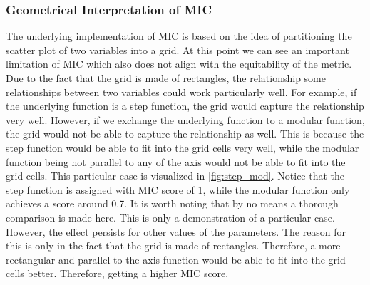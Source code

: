 \documentclass{article}
\begin{document}
\subsubsection{Geometrical Interpretation of MIC}
The underlying implementation of MIC is based on the idea of partitioning the scatter plot of two variables into a grid. At this point we can see an important limitation of MIC which also does not align with the equitability of the metric. Due to the fact that the grid is made of rectangles, the relationship some relationships between two variables could work particularly well. For example, if the underlying function is a step function, the grid would capture the relationship very well. However, if we exchange the underlying function to a modular function, the grid would not be able to capture the relationship as well. This is because the step function would be able to fit into the grid cells very well, while the modular function being not parallel to any of the axis would not be able to fit into the grid cells. This particular case is visualized in \autoref{fig:step_mod}. Notice that the step function is assigned with MIC score of 1, while the modular function only achieves a score around 0.7. It is worth noting that by no means a thorough comparison is made here. This is only a demonstration of a particular case. However, the effect persists for other values of the parameters. The reason for this is only in the fact that the grid is made of rectangles. Therefore, a more rectangular and parallel to the axis function would be able to fit into the grid cells better. Therefore, getting a higher MIC score.
\end{document}
